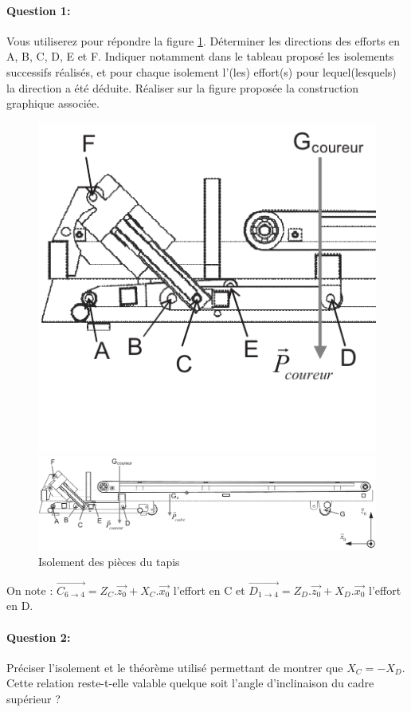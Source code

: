 \paragraph{Question 1:} Vous utiliserez pour répondre la figure \ref{img45}. Déterminer les directions des efforts en A, B, C, D, E et F. Indiquer notamment dans le tableau proposé les isolements successifs réalisés, et pour chaque isolement l'(les) effort(s) pour lequel(lesquels) la direction a été déduite. Réaliser sur la figure proposée la construction graphique associée.

\begin{figure}[!h]
    \centering\includegraphics[width=0.5\linewidth]{img/isolement_2.png}

\vspace{1cm}
 
   \centering\includegraphics[width=0.8\linewidth]{img/isolement.png}

 \vspace{-1.5cm}
    \caption{Isolement des pièces du tapis}
  \label{img45}
\end{figure}

On note : $\overrightarrow{C_{6 \rightarrow 4}}=Z_C.\overrightarrow{z_0}+X_C.\overrightarrow{x_0}$ l'effort en C et $\overrightarrow{D_{1 \rightarrow 4}}=Z_D.\overrightarrow{z_0}+X_D.\overrightarrow{x_0}$ l'effort en D.

\paragraph{Question 2:} Préciser l'isolement et le théorème utilisé permettant de montrer que $X_C=-X_D$. Cette relation reste-t-elle valable quelque soit l'angle d'inclinaison du cadre supérieur ?


